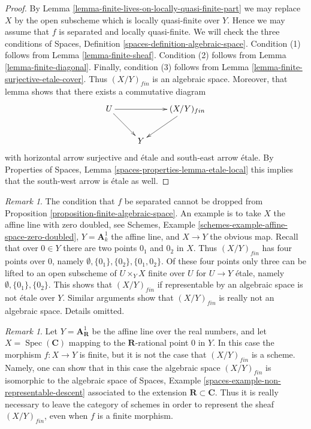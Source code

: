 \documentclass{stacks-project}
\theoremstyle{plain}
\theoremstyle{definition}
\theoremstyle{remark}
\newtheorem{remark}[subsection]{Remark}
\numberwithin{equation}{subsection}
\def\Spec{\mathop{\mathrm{Spec}}}
\begin{document}
\begin{proof}
By
Lemma \ref{lemma-finite-lives-on-locally-quasi-finite-part}
we may replace $X$ by the open subscheme which is locally quasi-finite
over $Y$. Hence we may assume that $f$ is separated and locally quasi-finite.
We will check the three conditions of
Spaces, Definition \ref{spaces-definition-algebraic-space}.
Condition (1) follows from
Lemma \ref{lemma-finite-sheaf}.
Condition (2) follows from
Lemma \ref{lemma-finite-diagonal}.
Finally, condition (3) follows from
Lemma \ref{lemma-finite-surjective-etale-cover}.
Thus $(X/Y)_{fin}$ is an algebraic space.
Moreover, that lemma shows that there exists a commutative
diagram
$$
\xymatrix{
U \ar[rr] \ar[rd] & & (X/Y)_{fin} \ar[ld] \\
& Y
}
$$
with horizontal arrow surjective and \'etale and south-east arrow
\'etale. By
Properties of Spaces, Lemma \ref{spaces-properties-lemma-etale-local}
this implies that the south-west arrow is \'etale as well.
\end{proof}

\begin{remark}
\label{remark-warning}
The condition that $f$ be separated cannot be dropped from
Proposition \ref{proposition-finite-algebraic-space}.
An example is to take $X$ the affine line with zero doubled, see
Schemes, Example \ref{schemes-example-affine-space-zero-doubled},
$Y = \mathbf{A}^1_k$ the affine line, and $X \to Y$ the obvious map.
Recall that over $0 \in Y$ there are two points $0_1$ and $0_2$
in $X$. Thus $(X/Y)_{fin}$ has four points over $0$, namely
$\emptyset, \{0_1\}, \{0_2\}, \{0_1, 0_2\}$.
Of these four points only three can be lifted to an open
subscheme of $U \times_Y X$ finite over $U$ for $U \to Y$ \'etale,
namely $\emptyset, \{0_1\}, \{0_2\}$. This shows that $(X/Y)_{fin}$
if representable by an algebraic space is not \'etale over $Y$.
Similar arguments show that $(X/Y)_{fin}$ is really not an algebraic
space. Details omitted.
\end{remark}

\begin{remark}
\label{remark-not-scheme}
Let $Y = \mathbf{A}^1_{\mathbf{R}}$ be the affine line over the real
numbers, and let $X = \Spec(\mathbf{C})$ mapping to the
$\mathbf{R}$-rational point $0$ in $Y$. In this case the morphism
$f : X \to Y$ is finite, but it is not the case that $(X/Y)_{fin}$
is a scheme. Namely, one can show that in this case the algebraic
space $(X/Y)_{fin}$ is isomorphic to the algebraic space of
Spaces, Example \ref{spaces-example-non-representable-descent}
associated to the extension $\mathbf{R} \subset \mathbf{C}$.
Thus it is really necessary to leave the category of schemes
in order to represent the sheaf $(X/Y)_{fin}$, even when $f$
is a finite morphism.
\end{remark}
\end{document}
